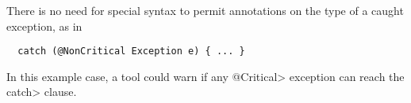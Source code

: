 \documentclass[10pt]{article}
\begin{document}

There is no need for special syntax to permit annotations on the type of a
caught exception, as in

\preverbnegspace
\begin{Verbatim}
  catch (@NonCritical Exception e) { ... }
\end{Verbatim}

\noindent
In this example case, a tool could warn if any \<@Critical> exception can
reach the \<catch> clause.

% 
% 
% 
% 



% 
\end{document}
